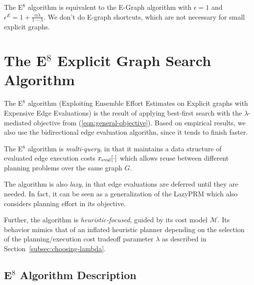 The E$^8$ algorithm
is equivalent to the E-Graph algorithm
with $\epsilon=1$ and $\epsilon^E = 1 + \frac{\alpha \lambda}{1-\lambda}$.
We don't do E-graph shortcuts,
which are not necessary for small explicit graphs.

\section{The E$^8$ Explicit Graph Search Algorithm}
\label{sec:e8-planner}

The E$^8$ algorithm
(Exploiting Ensemble Effort Estimates
on Explicit graphs with Expensive Edge Evaluations)
is the result of applying
best-first search with the $\lambda$-mediated objective
from (\ref{eqn:general-objective}).
Based on empirical results, we also use the bidirectional edge evaluation
algorithn,
since it tends to finish faster.

The E$^8$ algorithm is \emph{multi-query},
in that it maintains a data structure of evaluated edge
execution costs $x_{\mbox{\scriptsize eval}}[\cdot]$
which allows reuse between different planning problems
over the same graph $G$.

The algorithm is also \emph{lazy},
in that edge evaluations are deferred until they are needed.
In fact, it can be seen as a generalization of the
LazyPRM \cite{bohlin2000lazyprm}
which also considers planning effort in its objective.

Further,
the algorithm is \emph{heuristic-focused},
guided by its cost model $\mathcal{M}$.
Its behavior mimics that of an inflated heuristic planner
depending on the selection of the planning/execution cost
tradeoff parameter $\lambda$
as described in Section~\ref{subsec:choosing-lambda}.

\subsection{E$^8$ Algorithm Description}
\label{subsec:alg-e8-description}


